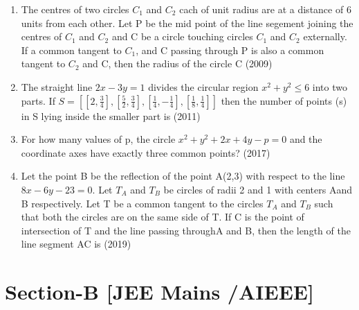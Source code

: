 \documentclass[12pt]{article}
\providecommand{\sbrak}[1]{\ensuremath{{}\left[#1\right]}}
\begin{document}
\begin{enumerate}
\item The centres of two circles $C_1$ and $C_2$ cach of unit radius are at a distance of 6 units from each other. Let P be the mid  point of the line segement joining the centres of $C_1$ and $C_2$ and C be a circle touching circles $C_1$ and $C_2$ externally. If a common tangent to $C_1$, and C passing through P is also a common tangent to $C_2$ and C, then the radius of the circle C (2009)
\item The straight line $2x-3y=1$ divides the circular region $x^2+y^2\leq 6$ into two parts. If $S=\sbrak{\sbrak{2,\frac{3}{4}},\sbrak{\frac{5}{2},\frac{3}{4}},\sbrak{\frac{1}{4},-\frac{1}{4}},\sbrak{\frac{1}{8},\frac{1}{4}}}$ then the number of points (s) in S lying inside the smaller part is (2011)
\item For how many values of p, the circle $x^2+y^2+2x+4y-p=0$ and the coordinate axes have exactly three common points? (2017)
\item Let the point B be the reflection of the point A(2,3) with respect to the line $8x-6y-23=0$. Let $T_A$ and $T_B$ be circles of radii 2 and 1 with centers Aand B respectively. Let T be a common tangent to the circles $T_A$ and $T_B$ such that both the circles are on the same side of T. If C is the point of intersection of T and the line passing throughA and B, then the length of the line segment AC is (2019)
\end{enumerate}

\section*{Section-B    [JEE Mains /AIEEE]}
\end{document}
